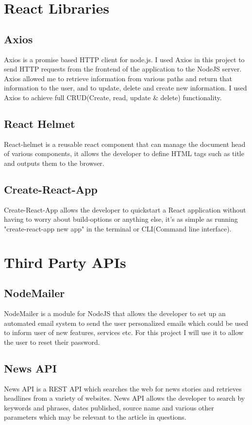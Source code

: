 \section{React Libraries}
\subsection{Axios}
Axios is a promise based HTTP client for node.js\cite{Axios}.  I used Axios in this project to send HTTP requests from the frontend of the application to the NodeJS server.  Axios allowed me to retrieve information from various paths and return that information to the user, and to update, delete and create new information.  I used Axios to achieve full CRUD(Create, read, update \& delete) functionality.
\subsection{React Helmet}
React-helmet is a reusable react component that can manage the document head of various components, it allows the developer to define HTML tags such as title and outputs them to the browser\cite{ReactHelmet}.
\subsection{Create-React-App}
Create-React-App allows the developer to quickstart a React application without having to worry about build-options or anything else, it's as simple as running "create-react-app new app" in the terminal or CLI(Command line interface)\cite{CreateReactApp}.
\section{Third Party APIs}
\subsection{NodeMailer}
NodeMailer is a module for NodeJS that allows the developer to set up an automated email system to send the user personalized emails which could be used to inform user of new features, services etc. For this project I will use it to allow the user to reset their password.
\subsection{News API}
News API is a REST API which searches the web for news stories and retrieves headlines from a variety of websites\cite{NewsAPI}.  News API allows the developer to search by keywords and phrases, dates published, source name and various other parameters which may be relevant to the article in questions.
